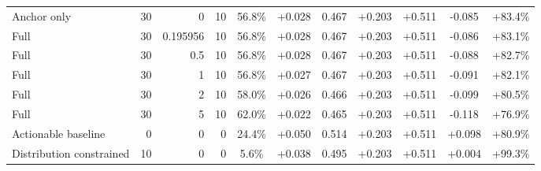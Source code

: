 \begin{table}[htbp]
\begin{tabular}{lrrrccccccc}
Anchor only & 30 & 0 & 10 & 56.8\% & +0.028 & 0.467 & +0.203 & +0.511 & -0.085 & +83.4\% \\
Full & 30 & 0.195956 & 10 & 56.8\% & +0.028 & 0.467 & +0.203 & +0.511 & -0.086 & +83.1\% \\
Full & 30 & 0.5 & 10 & 56.8\% & +0.028 & 0.467 & +0.203 & +0.511 & -0.088 & +82.7\% \\
Full & 30 & 1 & 10 & 56.8\% & +0.027 & 0.467 & +0.203 & +0.511 & -0.091 & +82.1\% \\
Full & 30 & 2 & 10 & 58.0\% & +0.026 & 0.466 & +0.203 & +0.511 & -0.099 & +80.5\% \\
Full & 30 & 5 & 10 & 62.0\% & +0.022 & 0.465 & +0.203 & +0.511 & -0.118 & +76.9\% \\
Actionable baseline & 0 & 0 & 0 & 24.4\% & +0.050 & 0.514 & +0.203 & +0.511 & +0.098 & +80.9\% \\
Distribution constrained & 10 & 0 & 0 & 5.6\% & +0.038 & 0.495 & +0.203 & +0.511 & +0.004 & +99.3\% \\
\bottomrule
\end{tabular}
\end{table}